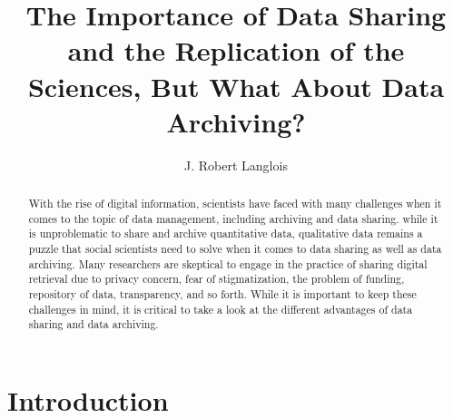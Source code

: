 \documentclass[sigconf]{acmart}
\begin{document}
\title{The Importance of Data Sharing and the Replication of the Sciences, But What About Data Archiving?}




\author{J. Robert Langlois}




\begin{abstract}
With the rise of digital information, scientists have faced with many challenges when it comes to the topic of data management, including archiving and data sharing. while it is unproblematic to share and archive quantitative data, qualitative data remains a puzzle that social scientists need to solve when it comes to data sharing as well as data archiving. Many researchers are skeptical to engage in the practice of sharing digital retrieval due to privacy concern, fear of stigmatization, the problem of funding, repository of data, transparency, and so forth. While it is important to keep these challenges in mind, it is critical to take a look at the different advantages of data sharing and data archiving. 

\end{abstract}



\maketitle



\section{Introduction}
\end{document}
